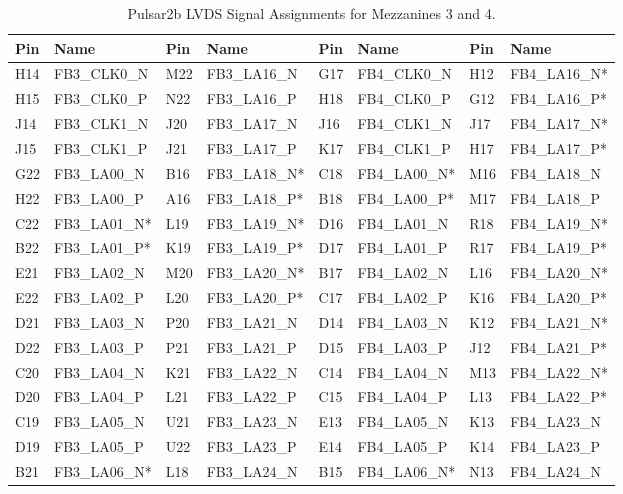 \documentclass[letterpaper]{article}
\begin{document}
\newpage

\begin{table}[htp]
\centering
\caption{Pulsar2b LVDS Signal Assignments for Mezzanines 3 and 4.}
\begin{tabular}{|l|l|l|l||l|l|l|l|} \hline
Pin & Name & Pin & Name & Pin & Name & Pin & Name \\ \hline \hline
H14 & FB3\_CLK0\_N & M22 & FB3\_LA16\_N & G17 & FB4\_CLK0\_N & H12 & FB4\_LA16\_N* \\ \hline
H15 & FB3\_CLK0\_P & N22 & FB3\_LA16\_P & H18 & FB4\_CLK0\_P & G12 & FB4\_LA16\_P* \\ \hline
J14 & FB3\_CLK1\_N & J20 & FB3\_LA17\_N & J16 & FB4\_CLK1\_N & J17 & FB4\_LA17\_N* \\ \hline
J15 & FB3\_CLK1\_P & J21 & FB3\_LA17\_P & K17 & FB4\_CLK1\_P & H17 & FB4\_LA17\_P* \\ \hline
G22 & FB3\_LA00\_N & B16 & FB3\_LA18\_N* & C18 & FB4\_LA00\_N* & M16 & FB4\_LA18\_N \\ \hline
H22 & FB3\_LA00\_P & A16 & FB3\_LA18\_P* & B18 & FB4\_LA00\_P* & M17 & FB4\_LA18\_P \\ \hline
C22 & FB3\_LA01\_N* & L19 & FB3\_LA19\_N* & D16 & FB4\_LA01\_N & R18 & FB4\_LA19\_N* \\ \hline
B22 & FB3\_LA01\_P* & K19 & FB3\_LA19\_P* & D17 & FB4\_LA01\_P & R17 & FB4\_LA19\_P* \\ \hline
E21 & FB3\_LA02\_N & M20 & FB3\_LA20\_N* & B17 & FB4\_LA02\_N & L16 & FB4\_LA20\_N* \\ \hline
E22 & FB3\_LA02\_P & L20 & FB3\_LA20\_P* & C17 & FB4\_LA02\_P & K16 & FB4\_LA20\_P* \\ \hline
D21 & FB3\_LA03\_N & P20 & FB3\_LA21\_N & D14 & FB4\_LA03\_N & K12 & FB4\_LA21\_N* \\ \hline
D22 & FB3\_LA03\_P & P21 & FB3\_LA21\_P & D15 & FB4\_LA03\_P & J12 & FB4\_LA21\_P* \\ \hline
C20 & FB3\_LA04\_N & K21 & FB3\_LA22\_N & C14 & FB4\_LA04\_N & M13 & FB4\_LA22\_N* \\ \hline
D20 & FB3\_LA04\_P & L21 & FB3\_LA22\_P & C15 & FB4\_LA04\_P & L13 & FB4\_LA22\_P* \\ \hline
C19 & FB3\_LA05\_N & U21 & FB3\_LA23\_N & E13 & FB4\_LA05\_N & K13 & FB4\_LA23\_N \\ \hline
D19 & FB3\_LA05\_P & U22 & FB3\_LA23\_P & E14 & FB4\_LA05\_P & K14 & FB4\_LA23\_P \\ \hline
B21 & FB3\_LA06\_N* & L18 & FB3\_LA24\_N & B15 & FB4\_LA06\_N* & N13 & FB4\_LA24\_N \\ \hline

\end{tabular}
\end{table}
\end{document}
